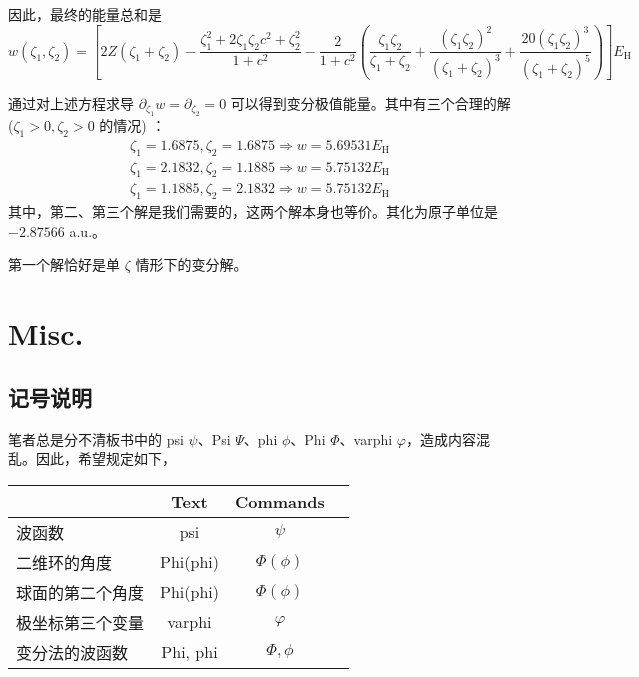 因此，最终的能量总和是
\begin{equation}
    w(\zeta_1, \zeta_2) = \left[ 2 Z (\zeta_1 + \zeta_2) - \frac{\zeta_1^2 + 2 \zeta_1 \zeta_2 c^2 + \zeta_2^2}{1 + c^2} - \frac{2}{1 + c^2} \left( \frac{\zeta_1 \zeta_2}{\zeta_1 + \zeta_2} + \frac{(\zeta_1 \zeta_2)^2}{(\zeta_1 + \zeta_2)^3} + \frac{20 (\zeta_1 \zeta_2)^3}{(\zeta_1 + \zeta_2)^5} \right) \right] E_{\mathrm{H}}
\end{equation}

通过对上述方程求导 $\partial_{\zeta_1} w = \partial_{\zeta_2} = 0$ 可以得到变分极值能量。其中有三个合理的解 ($\zeta_1 > 0, \zeta_2 > 0$ 的情况)%
：
\begin{gather*}
    \zeta_1 = 1.6875, \zeta_2 = 1.6875 \Rightarrow w = 5.69531 E_\mathrm{H} \\
    \zeta_1 = 2.1832, \zeta_2 = 1.1885 \Rightarrow w = 5.75132 E_\mathrm{H} \\
    \zeta_1 = 1.1885, \zeta_2 = 2.1832 \Rightarrow w = 5.75132 E_\mathrm{H}
\end{gather*}
其中，第二、第三个解是我们需要的，这两个解本身也等价。其化为原子单位是 $-2.87566 $ a.u.。

第一个解恰好是单 $\zeta$ 情形下的变分解。




\chapter{Misc.}
\section{记号说明}
笔者总是分不清板书中的 psi $\psi$、Psi $\Psi$、phi $\phi$、Phi $\Phi$、varphi $\varphi$，造成内容混乱。因此，希望规定如下，
\begin{table}[ht]
    \centering
    \begin{tabular}[t]{lccc}
    \toprule
    &Text&Commands\\
    \midrule
    波函数 & psi & $\psi$ \\
    二维环的角度 & Phi(phi) & $\Phi(\phi)$ \\
    球面的第二个角度 & Phi(phi) & $\Phi(\phi) $ \\
    极坐标第三个变量 & varphi & $\varphi$ \\
    变分法的波函数 & Phi, phi & $\Phi, \phi$ \\
    \bottomrule
    \end{tabular}
\end{table}%



